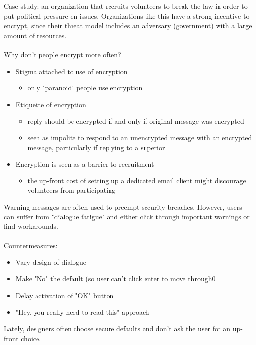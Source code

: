 Case study: an organization that recruits volunteers to break the law in order to put political pressure on issues. Organizations like this have a strong incentive to encrypt, since their threat model includes an adversary (government) with a large amount of resources. 
\\
\\ Why don't people encrypt more often?
	\begin{itemize}
		\item Stigma attached to use of encryption
			\begin{itemize}
				\item only "paranoid" people use encryption
			\end{itemize}
		\item Etiquette of encryption
			\begin{itemize}
				\item reply should be encrypted if and only if original message was encrypted
				\item seen as impolite to respond to an unencrypted message with an encrypted message, particularly if replying to a superior
			\end{itemize}
		\item Encryption is seen as a barrier to recruitment
			\begin{itemize}
				\item the up-front cost of setting up a dedicated email client might discourage volunteers from participating
			\end{itemize}
	\end{itemize}

Warning messages are often used to preempt security breaches. However, users can suffer from "dialogue fatigue" and either click through important warnings or find workarounds. 
\\
\\
Countermeasures:
	\begin{itemize}
		\item Vary design of dialogue
		\item Make "No" the default (so user can't click enter to move through0
		\item Delay activation of "OK" button
		\item "Hey, you really need to read this" approach
	\end{itemize}
Lately, designers often choose secure defaults and don't ask the user for an up-front choice. 

